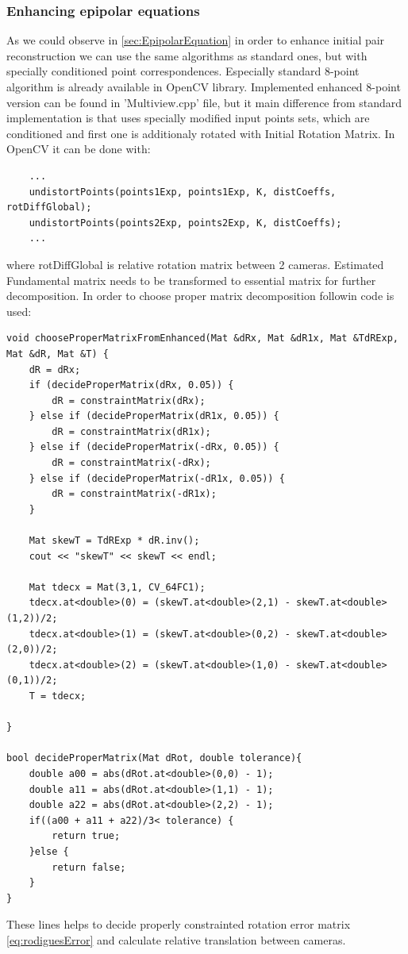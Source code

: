 \subsubsection{Enhancing epipolar equations}
As we could observe in \ref{sec:EpipolarEquation} in order to enhance initial pair reconstruction we can use the same algorithms as standard ones, but with specially conditioned point correspondences. Especially standard 8-point algorithm is already available in OpenCV library. Implemented enhanced 8-point version can be found in 'Multiview.cpp' file, but it main difference from standard implementation is that uses specially modified input points sets, which are conditioned and first one is additionaly rotated with Initial Rotation Matrix. In OpenCV it can be done  with:
\begin{lstlisting}
    ...
    undistortPoints(points1Exp, points1Exp, K, distCoeffs, rotDiffGlobal);
    undistortPoints(points2Exp, points2Exp, K, distCoeffs);
    ...
\end{lstlisting}
where rotDiffGlobal is relative rotation matrix between 2 cameras. Estimated Fundamental matrix needs to be transformed to essential matrix for further decomposition. In order to choose proper matrix decomposition followin code is used:
\begin{lstlisting}
void chooseProperMatrixFromEnhanced(Mat &dRx, Mat &dR1x, Mat &TdRExp, Mat &dR, Mat &T) {
    dR = dRx;
    if (decideProperMatrix(dRx, 0.05)) {
        dR = constraintMatrix(dRx);
    } else if (decideProperMatrix(dR1x, 0.05)) {
        dR = constraintMatrix(dR1x);
    } else if (decideProperMatrix(-dRx, 0.05)) {
        dR = constraintMatrix(-dRx);
    } else if (decideProperMatrix(-dR1x, 0.05)) {
        dR = constraintMatrix(-dR1x);
    }

    Mat skewT = TdRExp * dR.inv();
    cout << "skewT" << skewT << endl;

    Mat tdecx = Mat(3,1, CV_64FC1);
    tdecx.at<double>(0) = (skewT.at<double>(2,1) - skewT.at<double>(1,2))/2;
    tdecx.at<double>(1) = (skewT.at<double>(0,2) - skewT.at<double>(2,0))/2;
    tdecx.at<double>(2) = (skewT.at<double>(1,0) - skewT.at<double>(0,1))/2;
    T = tdecx;

}

bool decideProperMatrix(Mat dRot, double tolerance){
    double a00 = abs(dRot.at<double>(0,0) - 1);
    double a11 = abs(dRot.at<double>(1,1) - 1);
    double a22 = abs(dRot.at<double>(2,2) - 1);
    if((a00 + a11 + a22)/3< tolerance) {
        return true;
    }else {
        return false;
    }
}
\end{lstlisting}
These lines helps to decide properly constrainted rotation error matrix \ref{eq:rodiguesError} and calculate relative translation between cameras.
